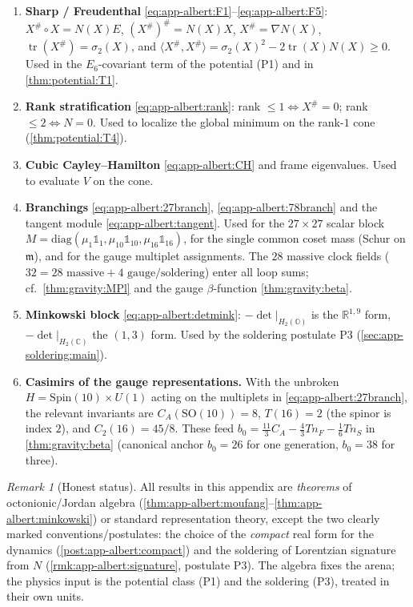 \documentclass[11pt]{article}
\theoremstyle{plain}
\theoremstyle{definition}
\theoremstyle{remark}
\newtheorem{remark}[theorem]{Remark}
\begin{document}
\begin{enumerate}
  \item \textbf{Sharp / Freudenthal} \eqref{eq:app-albert:F1}--\eqref{eq:app-albert:F5}:
    $X^\#\circ X=N(X)E$, $(X^\#)^\#=N(X)X$, $X^\#=\nabla N(X)$,
    $\operatorname{tr}(X^\#)=\sigma_2(X)$, and
    $\langle X^\#,X^\#\rangle=\sigma_2(X)^2-2\operatorname{tr}(X)N(X)\ge0$. Used in
    the $E_6$-covariant term of the potential (P1) and in
    \autoref{thm:potential:T1}.
  \item \textbf{Rank stratification} \eqref{eq:app-albert:rank}: rank $\le1
    \Leftrightarrow X^\#=0$; rank $\le2\Leftrightarrow N=0$. Used to localize the
    global minimum on the rank-$1$ cone (\autoref{thm:potential:T4}).
  \item \textbf{Cubic Cayley--Hamilton} \eqref{eq:app-albert:CH} and frame
    eigenvalues. Used to evaluate $V$ on the cone.
  \item \textbf{Branchings} \eqref{eq:app-albert:27branch},
    \eqref{eq:app-albert:78branch} and the tangent module
    \eqref{eq:app-albert:tangent}. Used for the $27\times27$ scalar block
    $M=\mathrm{diag}(\mu_1\mathbb 1_1,\mu_{10}\mathbb 1_{10},\mu_{16}\mathbb 1_{16})$,
    for the single common coset mass (Schur on $\mathfrak m$), and for the gauge
    multiplet assignments. The $28$ massive clock fields
    ($32=28\text{ massive}+4\text{ gauge/soldering}$) enter all loop sums; cf.\
    \autoref{thm:gravity:MPl} and the gauge $\beta$-function
    \autoref{thm:gravity:beta}.
  \item \textbf{Minkowski block} \eqref{eq:app-albert:detmink}: $-\det|_{H_2
    (\mathbb O)}$ is the $\mathbb R^{1,9}$ form, $-\det|_{H_2(\mathbb C)}$ the
    $(1,3)$ form. Used by the soldering postulate P3
    (\autoref{sec:app-soldering:main}).
  \item \textbf{Casimirs of the gauge representations.} With the unbroken
    $H=\mathrm{Spin}(10)\times U(1)$ acting on the multiplets in
    \eqref{eq:app-albert:27branch}, the relevant invariants are
    $C_A(\mathrm{SO}(10))=8$, $T(16)=2$ (the spinor is index $2$), and
    $C_2(16)=45/8$. These feed
    $b_0=\tfrac{11}{3}C_A-\tfrac43 T n_F-\tfrac16 T n_S$ in
    \autoref{thm:gravity:beta} (canonical anchor $b_0=26$ for one generation,
    $b_0=38$ for three).
\end{enumerate}

\begin{remark}[Honest status]\label{rmk:app-albert:status}
All results in this appendix are \emph{theorems} of octonionic/Jordan algebra
(\autoref{thm:app-albert:moufang}--\autoref{thm:app-albert:minkowski}) or standard
representation theory, except the two clearly marked conventions/postulates: the
choice of the \emph{compact} real form for the dynamics
(\autoref{post:app-albert:compact}) and the soldering of Lorentzian signature from
$N$ (\autoref{rmk:app-albert:signature}, postulate P3). The algebra fixes the
arena; the physics input is the potential class (P1) and the soldering (P3),
treated in their own units.
\end{remark}
\end{document}
